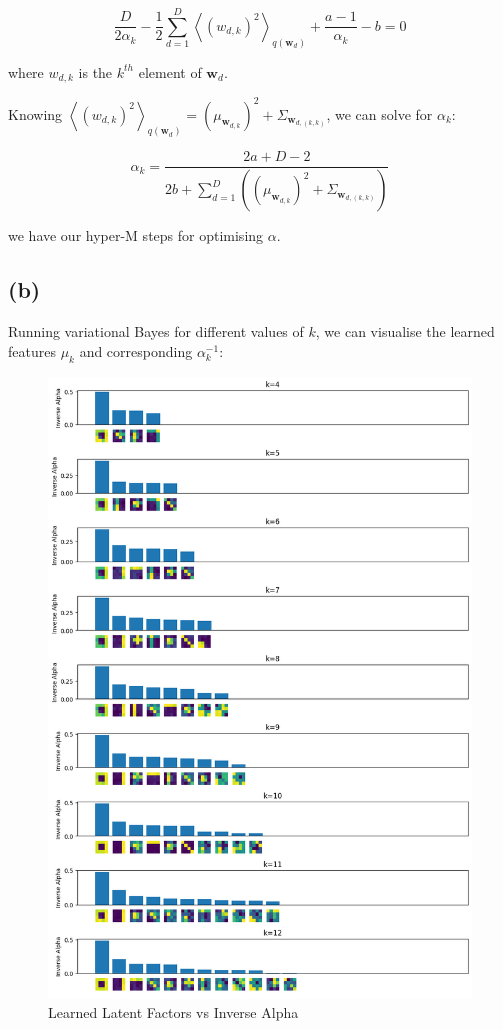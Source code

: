 \documentclass[12pt]{article}
\begin{document}
\[ \frac{D}{2\alpha_k} -\frac{1}{2} \sum_{d=1}^D\left\langle (w_{d, k})^2 \right\rangle_{q(\textbf{w}_{d})} + \frac{a-1}{\alpha_k} - b = 0\]

where $w_{d, k}$ is the $k^{th}$ element of $\textbf{w}_d$.

Knowing $\left\langle (w_{d, k})^2 \right\rangle_{q(\textbf{w}_{d})} = (\mu_{\textbf{w}_{d, k}})^2 + \Sigma_{\textbf{w}_{d, (k, k)}}$, we can solve for $\alpha_k$:

\[ \alpha_k = \frac{2a+D-2}{2b+ \sum_{d=1}^D \left((\mu_{\textbf{w}_{d, k}})^2 + \Sigma_{\textbf{w}_{d, (k, k)}}\right) }\]

we have our hyper-M steps for optimising $\alpha$.

\newpage
\subsection*{(b)}

Running variational Bayes for different values of $k$, we can visualise the learned features $\mu_k$ and corresponding $\alpha_k^{-1}$:

\begin{figure}[h]
\centering
\includegraphics[scale=0.47]{outputs/q4/b-1-latent-factors-comparison}
\caption{Learned Latent Factors vs Inverse Alpha}
\label{fig:}
\end{figure}
\end{document}
